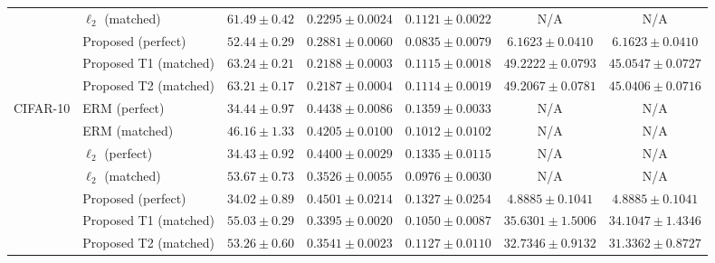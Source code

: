 \begin{table}[t]
\begin{tabular}{llccccc}
 & $\ell_2$ (matched) & $61.49\pm0.42$ & $0.2295\pm0.0024$ & $0.1121\pm0.0022$ & N/A & N/A\\
 & Proposed (perfect) & $52.44\pm0.29$ & $0.2881\pm0.0060$ & $0.0835\pm0.0079$ & $6.1623\pm0.0410$ & $6.1623\pm0.0410$\\
 & Proposed T1 (matched) & $63.24\pm0.21$ & $0.2188\pm0.0003$ & $0.1115\pm0.0018$ & $49.2222\pm0.0793$ & $45.0547\pm0.0727$\\
 & Proposed T2 (matched) & $63.21\pm0.17$ & $0.2187\pm0.0004$ & $0.1114\pm0.0019$ & $49.2067\pm0.0781$ & $45.0406\pm0.0716$\\
\addlinespace
CIFAR-10 & ERM (perfect) & $34.44\pm0.97$ & $0.4438\pm0.0086$ & $0.1359\pm0.0033$ & N/A & N/A\\
 & ERM (matched) & $46.16\pm1.33$ & $0.4205\pm0.0100$ & $0.1012\pm0.0102$ & N/A & N/A\\
 & $\ell_2$ (perfect) & $34.43\pm0.92$ & $0.4400\pm0.0029$ & $0.1335\pm0.0115$ & N/A & N/A\\
 & $\ell_2$ (matched) & $53.67\pm0.73$ & $0.3526\pm0.0055$ & $0.0976\pm0.0030$ & N/A & N/A\\
 & Proposed (perfect) & $34.02\pm0.89$ & $0.4501\pm0.0214$ & $0.1327\pm0.0254$ & $4.8885\pm0.1041$ & $4.8885\pm0.1041$\\
 & Proposed T1 (matched) & $55.03\pm0.29$ & $0.3395\pm0.0020$ & $0.1050\pm0.0087$ & $35.6301\pm1.5006$ & $34.1047\pm1.4346$\\
 & Proposed T2 (matched) & $53.26\pm0.60$ & $0.3541\pm0.0023$ & $0.1127\pm0.0110$ & $32.7346\pm0.9132$ & $31.3362\pm0.8727$\\
\bottomrule
\end{tabular}
\end{table}
